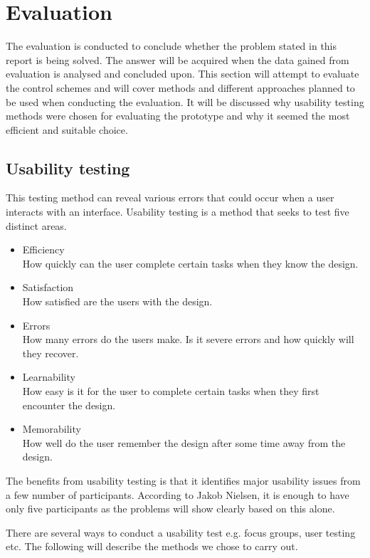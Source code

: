 \chapter{Evaluation}\label{Evaluation}
The evaluation is conducted to conclude whether the problem stated in this report is being solved. The answer will be acquired when the data gained from evaluation is analysed and concluded upon.
This section will attempt to evaluate the control schemes and will cover methods and different approaches planned to be used when conducting the evaluation. 
It will be discussed why usability testing methods were chosen for evaluating the prototype and why it seemed the most efficient and suitable choice. 

\section{Usability testing}
This testing method can reveal various errors that could occur when a user interacts with an interface. Usability testing is a method that seeks to test five distinct areas. \cite{usability}

\begin{itemize}
\item Efficiency\\
How quickly can the user complete certain tasks when they know the design. \cite{usability}
\item Satisfaction\\
How satisfied are the users with the design. \cite{usability}
\item Errors\\
How many errors do the users make. Is it severe errors and how quickly will they recover. \cite{usability}
\item Learnability\\
How easy is it for the user to complete certain tasks when they first encounter the design.\cite{usability}
\item Memorability\\
How well do the user remember the design after some time away from the design. \cite{usability}
\end{itemize}

The benefits from usability testing is that it identifies major usability issues from a few number of participants. \cite{usability}
According to Jakob Nielsen, it is enough to have only five participants as the problems will show clearly based on this alone. \cite{usability}

There are several ways to conduct a usability test e.g. focus groups, user testing etc.
The following will describe the methods we chose to carry out.
